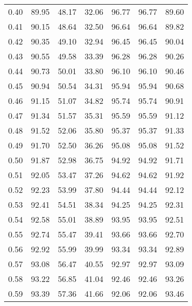 \begin{tabular}{|c|c|c|c|c|c|c|}
      0.40 &     89.95 &     48.17 &      32.06 &   96.77 &      96.77 &         89.60 \\
      0.41 &     90.15 &     48.64 &      32.50 &   96.64 &      96.64 &         89.82 \\
      0.42 &     90.35 &     49.10 &      32.94 &   96.45 &      96.45 &         90.04 \\
      0.43 &     90.55 &     49.58 &      33.39 &   96.28 &      96.28 &         90.26 \\
      0.44 &     90.73 &     50.01 &      33.80 &   96.10 &      96.10 &         90.46 \\
      0.45 &     90.94 &     50.54 &      34.31 &   95.94 &      95.94 &         90.68 \\
      0.46 &     91.15 &     51.07 &      34.82 &   95.74 &      95.74 &         90.91 \\
      0.47 &     91.34 &     51.57 &      35.31 &   95.59 &      95.59 &         91.12 \\
      0.48 &     91.52 &     52.06 &      35.80 &   95.37 &      95.37 &         91.33 \\
      0.49 &     91.70 &     52.50 &      36.26 &   95.08 &      95.08 &         91.52 \\
      0.50 &     91.87 &     52.98 &      36.75 &   94.92 &      94.92 &         91.71 \\
      0.51 &     92.05 &     53.47 &      37.26 &   94.62 &      94.62 &         91.92 \\
      0.52 &     92.23 &     53.99 &      37.80 &   94.44 &      94.44 &         92.12 \\
      0.53 &     92.41 &     54.51 &      38.34 &   94.25 &      94.25 &         92.31 \\
      0.54 &     92.58 &     55.01 &      38.89 &   93.95 &      93.95 &         92.51 \\
      0.55 &     92.74 &     55.47 &      39.41 &   93.66 &      93.66 &         92.70 \\
      0.56 &     92.92 &     55.99 &      39.99 &   93.34 &      93.34 &         92.89 \\
      0.57 &     93.08 &     56.47 &      40.55 &   92.97 &      92.97 &         93.09 \\
      0.58 &     93.22 &     56.85 &      41.04 &   92.46 &      92.46 &         93.26 \\
      0.59 &     93.39 &     57.36 &      41.66 &   92.06 &      92.06 &         93.46 \\

\end{tabular}
